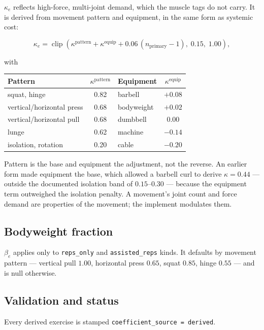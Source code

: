 \documentclass[11pt]{article}
\begin{document}
$\kappa_e$ reflects high-force, multi-joint demand, which the muscle tags do not carry. It is derived from movement pattern and equipment, in the same form as systemic cost:

\begin{equation}
\kappa_e=\operatorname{clip}\left(
\kappa^{\mathrm{pattern}}+\kappa^{\mathrm{equip}}+0.06\,(n_{\mathrm{primary}}-1),
\;0.15,\;1.00\right),
\end{equation}

with

\begin{center}
\begin{tabular}{lclc}
\toprule
Pattern & $\kappa^{\mathrm{pattern}}$ & Equipment & $\kappa^{\mathrm{equip}}$ \\
\midrule
squat, hinge & 0.82 & barbell & $+0.08$ \\
vertical/horizontal press & 0.68 & bodyweight & $+0.02$ \\
vertical/horizontal pull & 0.68 & dumbbell & $0.00$ \\
lunge & 0.62 & machine & $-0.14$ \\
isolation, rotation & 0.20 & cable & $-0.20$ \\
\bottomrule
\end{tabular}
\end{center}

Pattern is the base and equipment the adjustment, not the reverse. An earlier form made equipment the base, which allowed a barbell curl to derive $\kappa=0.44$ --- outside the documented isolation band of $0.15$--$0.30$ --- because the equipment term outweighed the isolation penalty. A movement's joint count and force demand are properties of the movement; the implement modulates them.

\subsection{Bodyweight fraction}

$\beta_e$ applies only to \texttt{reps\_only} and \texttt{assisted\_reps} kinds. It defaults by movement pattern --- vertical pull $1.00$, horizontal press $0.65$, squat $0.85$, hinge $0.55$ --- and is null otherwise.

\subsection{Validation and status}

Every derived exercise is stamped \texttt{coefficient\_source = derived}.
\end{document}
